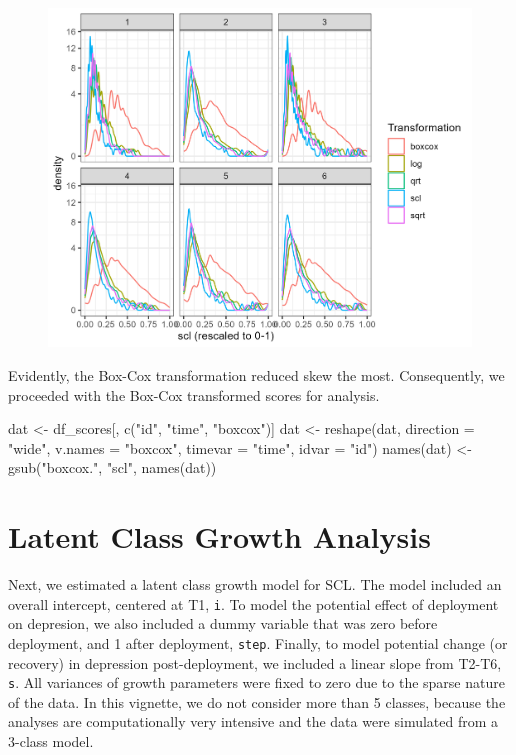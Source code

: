 \documentclass[
  man,floatsintext]{apa6}
\newenvironment{Shaded}{\begin{snugshade}}{\end{snugshade}}
\newcommand{\AttributeTok}[1]{\textcolor[rgb]{0.77,0.63,0.00}{#1}}
\newcommand{\FunctionTok}[1]{\textcolor[rgb]{0.00,0.00,0.00}{#1}}
\newcommand{\NormalTok}[1]{#1}
\newcommand{\OtherTok}[1]{\textcolor[rgb]{0.56,0.35,0.01}{#1}}
\newcommand{\StringTok}[1]{\textcolor[rgb]{0.31,0.60,0.02}{#1}}
\begin{document}
\begin{figure}
\includegraphics[width=0.5\linewidth]{appendices/plot_trans} \caption{ }\label{fig:unnamed-chunk-9}
\end{figure}

Evidently, the Box-Cox transformation reduced skew the most.
Consequently, we proceeded with the Box-Cox transformed scores for
analysis.

\begin{Shaded}
\begin{Highlighting}[]
\NormalTok{dat }\OtherTok{\textless{}{-}}\NormalTok{ df\_scores[, }\FunctionTok{c}\NormalTok{(}\StringTok{"id"}\NormalTok{, }\StringTok{"time"}\NormalTok{, }\StringTok{"boxcox"}\NormalTok{)]}
\NormalTok{dat }\OtherTok{\textless{}{-}} \FunctionTok{reshape}\NormalTok{(dat, }\AttributeTok{direction =} \StringTok{"wide"}\NormalTok{, }\AttributeTok{v.names =} \StringTok{"boxcox"}\NormalTok{, }\AttributeTok{timevar =} \StringTok{"time"}\NormalTok{, }\AttributeTok{idvar =} \StringTok{"id"}\NormalTok{)}
\FunctionTok{names}\NormalTok{(dat) }\OtherTok{\textless{}{-}} \FunctionTok{gsub}\NormalTok{(}\StringTok{"boxcox."}\NormalTok{, }\StringTok{"scl"}\NormalTok{, }\FunctionTok{names}\NormalTok{(dat))}
\end{Highlighting}
\end{Shaded}

\hypertarget{latent-class-growth-analysis}{%
\section{Latent Class Growth Analysis}\label{latent-class-growth-analysis}}

Next, we estimated a latent class growth model for SCL. The model
included an overall intercept, centered at T1, \texttt{i}. To model the
potential effect of deployment on depresion, we also included a dummy
variable that was zero before deployment, and 1 after deployment,
\texttt{step}. Finally, to model potential change (or recovery) in depression
post-deployment, we included a linear slope from T2-T6, \texttt{s}. All
variances of growth parameters were fixed to zero due to the sparse
nature of the data. In this vignette, we do not consider more than 5
classes, because the analyses are computationally very intensive and the
data were simulated from a 3-class model.
\end{document}
